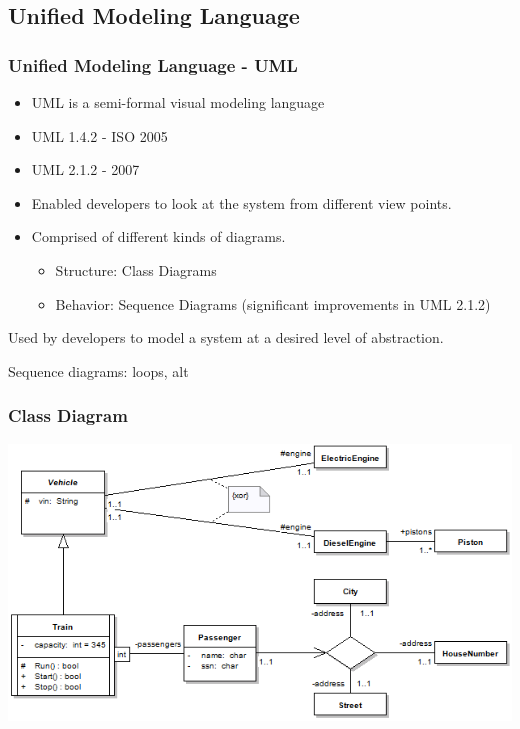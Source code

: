 \subsection{Unified Modeling Language}
%
%
\frame
{
  \frametitle{Unified Modeling Language - UML}

	\begin{itemize}
  		\item<1-> UML is a semi-formal visual modeling language
		\item UML 1.4.2 - ISO 2005
		\item UML 2.1.2 - 2007 
  		\item<2-> Enabled developers to look at the system from different view points.
  		\item<3-> Comprised of different kinds of diagrams.
		\begin{itemize}
				\item Structure: Class Diagrams
				\item Behavior: Sequence Diagrams (significant improvements in UML 2.1.2)
		\end{itemize}
  		 
	  	
  \end{itemize}

}

\note
{
Used by developers to model a system at a desired level of abstraction.

Sequence diagrams: loops, alt

}


%
%
\frame
{
  \frametitle{Class Diagram}

\begin{center}

\includegraphics[width=\textwidth]{images/ClassDiagramOverview.png}

\end{center}
}

